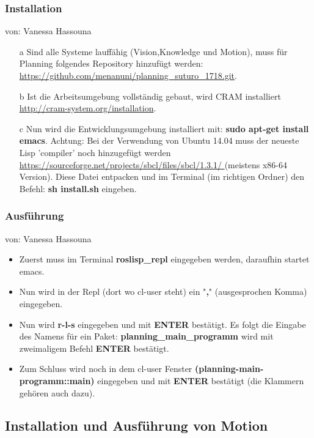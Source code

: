 \documentclass{suturo}
\makeatletter
\newcommand{\chapterauthor}[1]{%
  {\parindent0pt\vspace*{-27pt}%
  \linespread{0}\small\begin{flushright}von: #1\end{flushright}%
  \par\nobreak\vspace*{0pt}}
  \@afterheading%
}
\makeatother
\begin{document}
\subsubsection{Installation}
\chapterauthor{Vanessa Hassouna}
\begin{itemize}


\item[a] Sind alle Systeme lauffähig (Vision,Knowledge und Motion), muss für Planning folgendes Repository hinzufügt werden: \url{https://github.com/menanuni/planning_suturo_1718.git}. 

\item[b] Ist die Arbeitsumgebung vollständig gebaut, wird CRAM installiert \url{http://cram-system.org/installation}.

\item[c] Nun wird die Entwicklungsumgebung installiert mit: \textbf{sudo apt-get install emacs}. Achtung: Bei der Verwendung von Ubuntu 14.04 muss der neueste Lisp 'compiler' noch hinzugefügt werden \url{https://sourceforge.net/projects/sbcl/files/sbcl/1.3.1/
} (meistens x86-64 Version). Diese Datei entpacken und im Terminal (im richtigen Ordner) den Befehl: \textbf{sh install.sh} eingeben.
\end{itemize}

\subsubsection{Ausführung}
\chapterauthor{Vanessa Hassouna}
\begin{itemize}

\item Zuerst muss im Terminal \textbf{roslisp\_repl} eingegeben werden, daraufhin startet emacs. 

\item Nun wird in der Repl (dort wo cl-user steht) ein "\textbf{,}" (ausgesprochen Komma) eingegeben.

\item Nun wird \textbf{r-l-s} eingegeben und mit \textbf{ENTER} bestätigt. Es folgt die Eingabe des Namens für ein Paket: \textbf{planning\_main\_programm} wird mit zweimaligem Befehl \textbf{ENTER} bestätigt.

\item Zum Schluss wird noch in dem cl-user Fenster \textbf{(planning-main-programm::main)} eingegeben und mit \textbf{ENTER} bestätigt (die Klammern gehören auch dazu).
\end{itemize}


\subsection{Installation und Ausführung von Motion}
\end{document}
